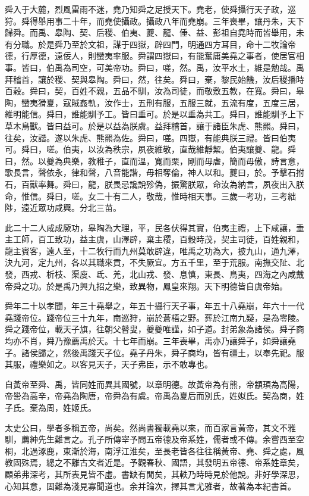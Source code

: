 \documentclass[twocolumn]{cvertbook}
\begin{document}
舜入于大麓，烈風雷雨不迷，堯乃知舜之足授天下。堯老，使舜攝行天子政，巡狩。舜得舉用事二十年，而堯使攝政。攝政八年而堯崩。三年喪畢，讓丹朱，天下歸舜。而禹、皋陶、契、后稷、伯夷、夔、龍、倕、益、彭祖自堯時而皆舉用，未有分職。於是舜乃至於文祖，謀于四嶽，辟四門，明通四方耳目，命十二牧論帝德，行厚德，遠佞人，則蠻夷率服。舜謂四嶽曰，有能奮庸美堯之事者，使居官相事。皆曰，伯禹為司空，可美帝功。舜曰，嗟，然。禹，汝平水土，維是勉哉。禹拜稽首，讓於稷、契與皋陶。舜曰，然，往矣。舜曰，棄，黎民始饑，汝后稷播時百穀。舜曰，契，百姓不親，五品不馴，汝為司徒，而敬敷五教，在寬。舜曰，皋陶，蠻夷猾夏，寇賊姦軌，汝作士，五刑有服，五服三就，五流有度，五度三居，維明能信。舜曰，誰能馴予工。皆曰垂可。於是以垂為共工。舜曰，誰能馴予上下草木鳥獸。皆曰益可。於是以益為朕虞。益拜稽首，讓于諸臣朱虎、熊羆。舜曰，往矣，汝諧。遂以朱虎、熊羆為佐。舜曰，嗟。四嶽，有能典朕三禮。皆曰伯夷可。舜曰，嗟。伯夷，以汝為秩宗，夙夜維敬，直哉維靜絜。伯夷讓夔、龍。舜曰，然。以夔為典樂，教稚子，直而溫，寬而栗，剛而毋虐，簡而毋傲，詩言意，歌長言，聲依永，律和聲，八音能諧，毋相奪倫，神人以和。夔曰，於。予擊石拊石，百獸率舞。舜曰，龍，朕畏忌讒說殄偽，振驚朕眾，命汝為納言，夙夜出入朕命，惟信。舜曰，嗟。女二十有二人，敬哉，惟時相天事。三歲一考功，三考絀陟，遠近眾功咸興。分北三苗。

此二十二人咸成厥功，皋陶為大理，平，民各伏得其實，伯夷主禮，上下咸讓，垂主工師，百工致功，益主虞，山澤辟，棄主稷，百穀時茂，契主司徒，百姓親和，龍主賓客，遠人至，十二牧行而九州莫敢辟違，唯禹之功為大，披九山，通九澤，決九河，定九州，各以其職來貢，不失厥宜。方五千里，至于荒服。南撫交阯、北發，西戎、析枝、渠廋、氐、羌，北山戎、發、息慎，東長、鳥夷，四海之內咸戴帝舜之功。於是禹乃興九招之樂，致異物，鳳皇來翔。天下明德皆自虞帝始。

舜年二十以孝聞，年三十堯舉之，年五十攝行天子事，年五十八堯崩，年六十一代堯踐帝位。踐帝位三十九年，南巡狩，崩於蒼梧之野。葬於江南九疑，是為零陵。舜之踐帝位，載天子旗，往朝父瞽叟，夔夔唯謹，如子道。封弟象為諸侯。舜子商均亦不肖，舜乃豫薦禹於天。十七年而崩。三年喪畢，禹亦乃讓舜子，如舜讓堯子。諸侯歸之，然後禹踐天子位。堯子丹朱，舜子商均，皆有疆土，以奉先祀。服其服，禮樂如之。以客見天子，天子弗臣，示不敢專也。

自黃帝至舜、禹，皆同姓而異其國號，以章明德。故黃帝為有熊，帝顓頊為高陽，帝嚳為高辛，帝堯為陶唐，帝舜為有虞。帝禹為夏后而別氏，姓姒氏。契為商，姓子氏。棄為周，姓姬氏。

太史公曰，學者多稱五帝，尚矣。然尚書獨載堯以來，而百家言黃帝，其文不雅馴，薦紳先生難言之。孔子所傳宰予問五帝德及帝系姓，儒者或不傳。余嘗西至空桐，北過涿鹿，東漸於海，南浮江淮矣，至長老皆各往往稱黃帝、堯、舜之處，風教固殊焉，總之不離古文者近是。予觀春秋、國語，其發明五帝德、帝系姓章矣，顧弟弗深考，其所表見皆不虛。書缺有閒矣，其軼乃時時見於他說。非好學深思，心知其意，固難為淺見寡聞道也。余并論次，擇其言尤雅者，故著為本紀書首。
\end{document}
